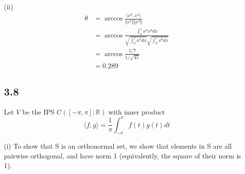\documentclass{article}
\newcommand{\inprod}[1]{\langle #1 \rangle}
\begin{document}
	(ii)
	\begin{align*}
	\theta &= \arccos \frac{\inprod{x^2, x^4}}{\Vert x^2 \Vert \Vert x^4 \Vert} \\
	&= \arccos \frac{\int_{0}^{1} x^2 x^4 dx}{\sqrt{\int_{0}^{1} x^4 dx} \sqrt{\int_{0}^{1} x^8 dx}}\\
	&= \arccos \frac{1/7}{1/\sqrt{45}} \\
	&= 0.289
	\end{align*}
	
	\subsection*{3.8}
	Let $V$ be the IPS $C([-\pi, \pi];\mathbb{R})$ with inner product
	\[\inprod{f,g} = \frac{1}{\pi} \int_{-\pi}^{\pi} f(t)g(t) dt \]
	
	(i) To show that S is an orthonormal set, we show that elements in S are all pairwise orthogonal, and have norm 1 (equivalently, the square of their norm is 1).
	
\end{document}
